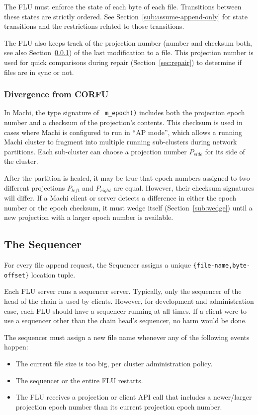 \documentclass[preprint,10pt]{sigplanconf}
\begin{document}
The FLU must enforce the state of each byte of each file.
Transitions between these states are strictly ordered.
See Section~\ref{sub:assume-append-only} for state transitions and
the restrictions related to those transitions.

The FLU also keeps track of the projection number (number and checksum
both, see also Section~\ref{sub:flu-divergence}) of the last modification to a
file.  This projection number is used for quick comparisons during
repair (Section~\ref{sec:repair}) to determine if files are in sync or
not.

\subsubsection{Divergence from CORFU}
\label{sub:flu-divergence}

In Machi, the type signature of {\tt
  m\_epoch()} includes both the projection epoch number and a checksum
of the projection's contents.  This checksum is used in cases where
Machi is configured to run in ``AP mode'', which allows a running Machi
cluster to fragment into multiple running sub-clusters during network
partitions.  Each sub-cluster can choose a projection number
$P_{side}$ for its side of the cluster.

After the partition is
healed, it may be true that epoch numbers assigned to two different
projections $P_{left}$ and  $P_{right}$
are equal.  However, their checksum signatures will differ.  If a
Machi client or server detects a difference in either the epoch number
or the epoch checksum, it must wedge itself (Section~\ref{sub:wedge})
until a new projection with a larger epoch number is available.

\subsection{The Sequencer}
\label{sub:sequencer}

For every file append request, the Sequencer assigns a unique
{\tt \{file-name,byte-offset\}} location tuple.

Each FLU server runs a sequencer server.  Typically, only the
sequencer of the head of the chain is used by clients.  However, for
development and administration ease, each FLU should have a sequencer
running at all times.  If a client were to use a sequencer other than
the chain head's sequencer, no harm would be done.

The sequencer must assign a new file name whenever any of the
following events happen:
\begin{itemize}
\item The current file size is too big, per cluster administration policy.
\item The sequencer or the entire FLU restarts.
\item The FLU receives a projection or client API call
  that includes a newer/larger projection epoch
  number than its current projection epoch number.
\end{itemize}
\end{document}
